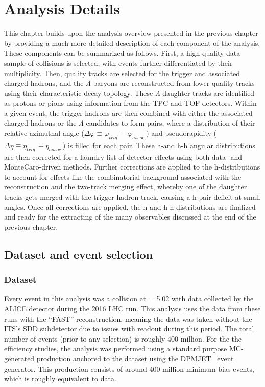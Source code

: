 \chapter{Analysis Details}
\label{chapter_analysis_details}

This chapter builds upon the analysis overview presented in the previous chapter by providing a much more detailed description of each component of the analysis. These components can be summarized as follows. First, a high-quality data sample of \pPb collisions is selected, with events further differentiated by their multiplicity. Then, quality tracks are selected for the trigger and associated charged hadrons, and the $\Lambda$ baryons are reconstructed from lower quality tracks using their characteristic decay topology. These $\Lambda$ daughter tracks are identified as protons or pions using information from the TPC and TOF detectors. Within a given event, the trigger hadrons are then combined with either the associated charged hadrons or the $\Lambda$ candidates to form pairs, where a distribution of their relative azimuthal angle ($\Delta\varphi \equiv \varphi_{trig.} - \varphi_{assoc.}$) and pseudorapidity ($\Delta\eta \equiv \eta_{trig.} - \eta_{assoc.}$) is filled for each pair. These h-\lmb and h-h angular distributions are then corrected for a laundry list of detector effects using both data- and MonteCaro-driven methods. Further corrections are applied to the h-\lmb distributions to account for effects like the combinatorial background associated with the \lmb reconstruction and the two-track merging effect, whereby one of the daughter tracks gets merged with the trigger hadron track, causing a h-\lmb pair deficit at small angles. Once all corrections are applied, the h-\lmb and h-h distributions are finalized and ready for the extracting of the many observables discussed at the end of the previous chapter.

\section{Dataset and event selection}
\label{sec:event_selection}

\subsection{Dataset}

Every event in this analysis was a \pPb collision at \snn = 5.02 \TeV with data collected by the ALICE detector during the 2016 LHC run. This analysis uses the data from these runs with the ``FAST'' reconstruction, meaning the data was taken without the ITS's SDD subdetector due to issues with readout during this period. The total number of events (prior to any selection) is roughly 400 million. For the the efficiency studies, the analysis was performed using a standard purpose MC-generated production anchored to the dataset using the DPMJET~\cite{DPMJET} event generator. This production consists of around 400 million minimum bias events, which is roughly equivalent to data.

